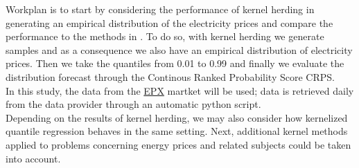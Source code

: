 Workplan is to start by considering the performance of kernel herding in generating an empirical distribution of the electricity prices and compare the performance to the methods in \cite{probablistic_electricity_forecast}.
To do so, with kernel herding we generate samples and as a consequence we also have an empirical distribution of electricity prices. Then we take the quantiles from 0.01 to 0.99 and finally we evaluate the distribution forecast through the Continous Ranked Probability Score CRPS.
\\
In this study, the data from the \href{https://www.epexspot.com/en/market-data?market_area=CH&trading_date=2023-12-11&delivery_date=2023-12-12&underlying_year=&modality=Auction&sub_modality=DayAhead&technology=&product=60&data_mode=table&period=&production_period=}{EPX} martket will be used; data is retrieved daily from the data provider through an automatic python script.
\\
Depending on the results of kernel herding, we may also consider how kernelized quantile regression behaves in the same setting. Next, additional kernel methods applied to problems concerning energy prices and related subjects could be taken into account.
